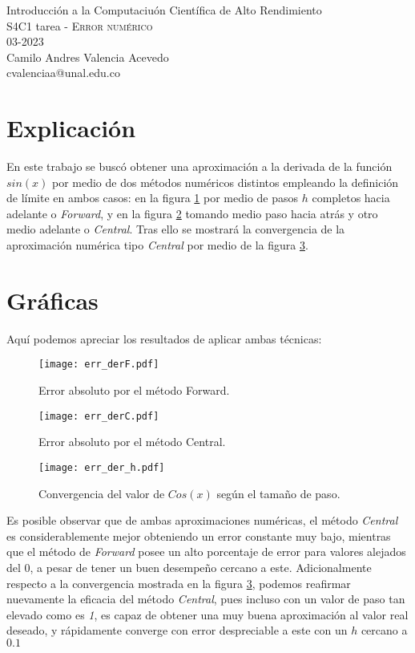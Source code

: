 \documentclass[11pt,letterpaper]{exam}
\begin{document}
\begin{center}
{\Large Introducción a la Computaciuón Científica de Alto Rendimiento} \\
S4C1 tarea - \textsc{Error numérico}\\
03-2023\\
Camilo Andres Valencia Acevedo\\
cvalenciaa@unal.edu.co
\end{center}


\section{Explicación}
En este trabajo se buscó obtener una aproximación a la derivada de la función $sin(x)$ por medio de dos métodos numéricos distintos empleando la definición de límite en ambos casos: en la figura \ref{fig:forward} por medio de pasos $h$ completos hacia adelante o \textit{Forward}, y en la figura \ref{fig:central} tomando medio paso hacia atrás y otro medio adelante o \textit{Central}.
Tras ello se mostrará la convergencia de la aproximación numérica tipo \textit{Central} por medio de la figura \ref{fig:convergencia}.

\noindent
\section{Gr\'aficas}
Aquí podemos apreciar los resultados de aplicar ambas técnicas:
\begin{figure}[H]
    \centering
    \texttt{[image: err\_derF.pdf]} 
    \caption{Error absoluto por el método Forward.}
    \label{fig:forward}
\end{figure}

\begin{figure}[H]
    \centering
    \texttt{[image: err\_derC.pdf]} 
    \caption{Error absoluto por el método Central.}
    \label{fig:central}
\end{figure}

\begin{figure}[H]
    \centering
    \texttt{[image: err\_der\_h.pdf]} 
    \caption{Convergencia del valor de $Cos(x)$ según el tamaño de paso.}
    \label{fig:convergencia}
\end{figure}

Es posible observar que de ambas aproximaciones numéricas, el método \textit{Central} es considerablemente mejor obteniendo un error constante muy bajo, mientras que el método de \textit{Forward} posee un alto porcentaje de error para valores alejados del 0, a pesar de tener un buen desempeño cercano a este.
Adicionalmente respecto a la convergencia mostrada en la figura \ref{fig:convergencia}, podemos reafirmar nuevamente la eficacia del método \textit{Central}, pues incluso con un valor de paso tan elevado como es \textit{1}, es capaz de obtener una muy buena aproximación al valor real deseado, y rápidamente converge con error despreciable a este con un $h$ cercano a $0.1$
\end{document}
